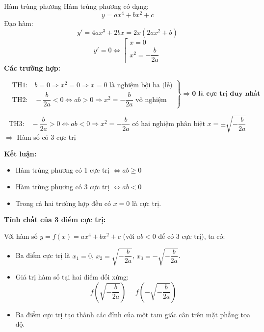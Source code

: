 \begin{lythuyetbox}{Hàm trùng phương}
  Hàm trùng phương có dạng:
\[
    y = ax^4 + bx^2 + c
\]
Đạo hàm:
\[
    y' = 4a x^3 + 2b x = 2x(2a x^2 + b)
\]
\[
    y' = 0 \Leftrightarrow
    \left[\begin{array}{l}
        x = 0 \\  x^2 = -\dfrac{b}{2a}
    \end{array}\right.
\]
\textbf{Các trường hợp:}

\[
\left.\begin{aligned}
    &\text{TH1:}\quad b = 0 \Rightarrow x^2 = 0 \Rightarrow x = 0 \text{ là nghiệm bội ba (lẻ)} \\
    &\text{TH2:}\quad -\dfrac{b}{2a} < 0 \Leftrightarrow ab > 0 \Rightarrow x^2 = -\dfrac{b}{2a} \text{ vô nghiệm}
\end{aligned}\right\}
\Rightarrow \textbf{0 là cực trị duy nhất}
\]

\[
\text{TH3:}\quad -\dfrac{b}{2a} > 0 \Leftrightarrow ab < 0 \Rightarrow x^2 = -\dfrac{b}{2a} \text{ có hai nghiệm phân biệt } x = \pm \sqrt{-\dfrac{b}{2a}}
\]
\qquad $\Rightarrow$ Hàm số có 3 cực trị

\vspace{1.5em}
\textbf{Kết luận:}
\begin{itemize}
    \item Hàm trùng phương có 1 cực trị $\iff ab \geq 0$
    \item Hàm trùng phương có 3 cực trị $\iff ab < 0$
    \item Trong cả hai trường hợp đều có $x = 0$ là cực trị.
\end{itemize}

\textbf{Tính chất của 3 điểm cực trị:}

Với hàm số $y = f(x) = ax^4 + bx^2 + c$ (với $ab < 0$ để có 3 cực trị), ta có:

\begin{itemize}
    \item Ba điểm cực trị là $x_1 = 0$, $x_2 = \sqrt{-\dfrac{b}{2a}}$, $x_3 = -\sqrt{-\dfrac{b}{2a}}$.
    \item Giá trị hàm số tại hai điểm đối xứng:
    \[
        f\left(\sqrt{-\dfrac{b}{2a}}\right) = f\left(-\sqrt{-\dfrac{b}{2a}}\right)
    \]
    \item Ba điểm cực trị tạo thành các đỉnh của một tam giác cân trên mặt phẳng tọa độ.
\end{itemize}


\end{lythuyetbox}
